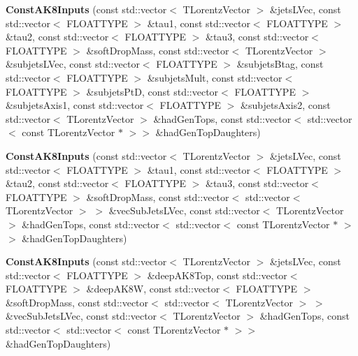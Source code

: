 \begin{DoxyCompactItemize}
\item 
\hypertarget{classttUtility_1_1ConstAK8Inputs_a55c6c535734b2ebcabc13821d64848f6}{{\bfseries Const\-A\-K8\-Inputs} (const std\-::vector$<$ T\-Lorentz\-Vector $>$ \&jets\-L\-Vec, const std\-::vector$<$ F\-L\-O\-A\-T\-T\-Y\-P\-E $>$ \&tau1, const std\-::vector$<$ F\-L\-O\-A\-T\-T\-Y\-P\-E $>$ \&tau2, const std\-::vector$<$ F\-L\-O\-A\-T\-T\-Y\-P\-E $>$ \&tau3, const std\-::vector$<$ F\-L\-O\-A\-T\-T\-Y\-P\-E $>$ \&soft\-Drop\-Mass, const std\-::vector$<$ T\-Lorentz\-Vector $>$ \&subjets\-L\-Vec, const std\-::vector$<$ F\-L\-O\-A\-T\-T\-Y\-P\-E $>$ \&subjets\-Btag, const std\-::vector$<$ F\-L\-O\-A\-T\-T\-Y\-P\-E $>$ \&subjets\-Mult, const std\-::vector$<$ F\-L\-O\-A\-T\-T\-Y\-P\-E $>$ \&subjets\-Pt\-D, const std\-::vector$<$ F\-L\-O\-A\-T\-T\-Y\-P\-E $>$ \&subjets\-Axis1, const std\-::vector$<$ F\-L\-O\-A\-T\-T\-Y\-P\-E $>$ \&subjets\-Axis2, const std\-::vector$<$ T\-Lorentz\-Vector $>$ \&had\-Gen\-Tops, const std\-::vector$<$ std\-::vector$<$ const T\-Lorentz\-Vector $\ast$ $>$$>$ \&had\-Gen\-Top\-Daughters)}\label{classttUtility_1_1ConstAK8Inputs_a55c6c535734b2ebcabc13821d64848f6}

\item 
\hypertarget{classttUtility_1_1ConstAK8Inputs_a528a5eb1b2efbec86749a7cc9867cad9}{{\bfseries Const\-A\-K8\-Inputs} (const std\-::vector$<$ T\-Lorentz\-Vector $>$ \&jets\-L\-Vec, const std\-::vector$<$ F\-L\-O\-A\-T\-T\-Y\-P\-E $>$ \&tau1, const std\-::vector$<$ F\-L\-O\-A\-T\-T\-Y\-P\-E $>$ \&tau2, const std\-::vector$<$ F\-L\-O\-A\-T\-T\-Y\-P\-E $>$ \&tau3, const std\-::vector$<$ F\-L\-O\-A\-T\-T\-Y\-P\-E $>$ \&soft\-Drop\-Mass, const std\-::vector$<$ std\-::vector$<$ T\-Lorentz\-Vector $>$ $>$ \&vec\-Sub\-Jets\-L\-Vec, const std\-::vector$<$ T\-Lorentz\-Vector $>$ \&had\-Gen\-Tops, const std\-::vector$<$ std\-::vector$<$ const T\-Lorentz\-Vector $\ast$ $>$$>$ \&had\-Gen\-Top\-Daughters)}\label{classttUtility_1_1ConstAK8Inputs_a528a5eb1b2efbec86749a7cc9867cad9}

\item 
\hypertarget{classttUtility_1_1ConstAK8Inputs_adf40dfcfc455bf64e3cc752fb6b65040}{{\bfseries Const\-A\-K8\-Inputs} (const std\-::vector$<$ T\-Lorentz\-Vector $>$ \&jets\-L\-Vec, const std\-::vector$<$ F\-L\-O\-A\-T\-T\-Y\-P\-E $>$ \&deep\-A\-K8\-Top, const std\-::vector$<$ F\-L\-O\-A\-T\-T\-Y\-P\-E $>$ \&deep\-A\-K8\-W, const std\-::vector$<$ F\-L\-O\-A\-T\-T\-Y\-P\-E $>$ \&soft\-Drop\-Mass, const std\-::vector$<$ std\-::vector$<$ T\-Lorentz\-Vector $>$ $>$ \&vec\-Sub\-Jets\-L\-Vec, const std\-::vector$<$ T\-Lorentz\-Vector $>$ \&had\-Gen\-Tops, const std\-::vector$<$ std\-::vector$<$ const T\-Lorentz\-Vector $\ast$ $>$$>$ \&had\-Gen\-Top\-Daughters)}\label{classttUtility_1_1ConstAK8Inputs_adf40dfcfc455bf64e3cc752fb6b65040}


\end{DoxyCompactItemize}
